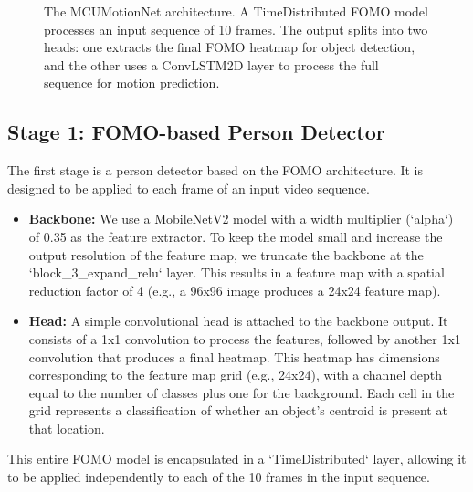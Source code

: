 \documentclass{article}
\begin{document}
\begin{figure}[h!]
{
}
\caption{The MCUMotionNet architecture. A TimeDistributed FOMO model processes an input sequence of 10 frames. The output splits into two heads: one extracts the final FOMO heatmap for object detection, and the other uses a ConvLSTM2D layer to process the full sequence for motion prediction.}
\label{fig:architecture}
\end{figure}

\subsection{Stage 1: FOMO-based Person Detector}
The first stage is a person detector based on the FOMO architecture. It is designed to be applied to each frame of an input video sequence.
\begin{itemize}
    \item \textbf{Backbone:} We use a MobileNetV2 model with a width multiplier (`alpha`) of 0.35 as the feature extractor. To keep the model small and increase the output resolution of the feature map, we truncate the backbone at the `block_3_expand_relu` layer. This results in a feature map with a spatial reduction factor of 4 (e.g., a 96x96 image produces a 24x24 feature map).
    \item \textbf{Head:} A simple convolutional head is attached to the backbone output. It consists of a 1x1 convolution to process the features, followed by another 1x1 convolution that produces a final heatmap. This heatmap has dimensions corresponding to the feature map grid (e.g., 24x24), with a channel depth equal to the number of classes plus one for the background. Each cell in the grid represents a classification of whether an object's centroid is present at that location.
\end{itemize}
This entire FOMO model is encapsulated in a `TimeDistributed` layer, allowing it to be applied independently to each of the 10 frames in the input sequence.
\end{document}
